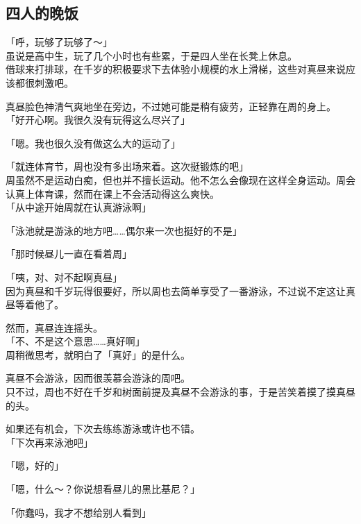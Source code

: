 \subsection{四人的晚饭}

「呼，玩够了玩够了～」\\

虽说是高中生，玩了几个小时也有些累，于是四人坐在长凳上休息。\\

借球来打排球，在千岁的积极要求下去体验小规模的水上滑梯，这些对真昼来说应该都很刺激吧。

真昼脸色神清气爽地坐在旁边，不过她可能是稍有疲劳，正轻靠在周的身上。\\

「好开心啊。我很久没有玩得这么尽兴了」

「嗯。我也很久没有做这么大的运动了」

「就连体育节，周也没有多出场来着。这次挺锻炼的吧」\\

周虽然不是运动白痴，但也并不擅长运动。他不怎么会像现在这样全身运动。周会认真上体育课，然而在课上不会活动得这么爽快。\\

「从中途开始周就在认真游泳啊」

「泳池就是游泳的地方吧……偶尔来一次也挺好的不是」

「那时候昼儿一直在看着周」

「咦，对、对不起啊真昼」\\

因为真昼和千岁玩得很要好，所以周也去简单享受了一番游泳，不过说不定这让真昼等着他了。

然而，真昼连连摇头。\\

「不、不是这个意思……真好啊」\\

周稍微思考，就明白了「真好」的是什么。

真昼不会游泳，因而很羡慕会游泳的周吧。\\

只不过，周也不好在千岁和树面前提及真昼不会游泳的事，于是苦笑着摸了摸真昼的头。

如果还有机会，下次去练练游泳或许也不错。\\

「下次再来泳池吧」

「嗯，好的」

「嗯，什么～？你说想看昼儿的黑比基尼？」

「你蠢吗，我才不想给别人看到」

